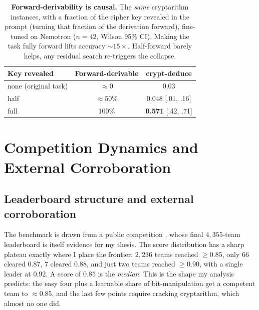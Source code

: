 \documentclass[11pt]{article}
\begin{document}
\begin{table}[htbp]
\centering
\caption{\textbf{Forward-derivability is causal.} The \emph{same} cryptarithm instances, with a
fraction of the cipher key revealed in the prompt (turning that fraction of the derivation
forward), fine-tuned on Nemotron ($n{=}42$, Wilson 95\% CI). Making the task fully forward lifts
accuracy $\sim\!15\times$. Half-forward barely helps, any residual search re-triggers the
collapse.}
\label{tab:interv}
\small
\begin{tabular}{l c c}
\toprule
Key revealed & Forward-derivable & crypt-deduce \\
\midrule
none (original task) & $\approx$0 & 0.03 \\
half & $\approx$50\% & 0.048 [.01, .16] \\
full & 100\% & \textbf{0.571} [.42, .71] \\
\bottomrule
\end{tabular}
\end{table}

\section{Competition Dynamics and External Corroboration}
\label{sec:dynamics}

\subsection{Leaderboard structure and external corroboration}

The benchmark is drawn from a public competition \citep{nemotronchallenge2026}, whose final
$4{,}355$-team leaderboard is itself evidence for my thesis. The score distribution has a
sharp plateau exactly where I place the frontier: $2{,}236$ teams reached $\geq\!0.85$, only
$66$ cleared $0.87$, $7$ cleared $0.88$, and just two teams reached $\geq\!0.90$, with a
single leader at $0.92$. A score of $0.85$ is the \emph{median}. This is the shape my
analysis predicts: the easy four plus a learnable share of bit-manipulation get a competent
team to $\approx\!0.85$, and the last few points require cracking cryptarithm, which almost
no one did.
\end{document}
